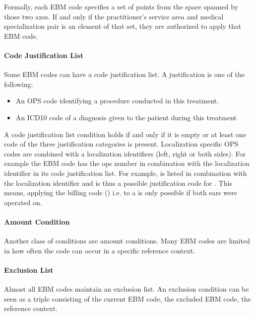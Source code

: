 Formally, each EBM code specifies a set of points from the space spanned by those two axes.
If and only if the practitioner's service area and medical specialization pair is an element of that set, they are authorized to apply that EBM code.


\paragraph{Code Justification List}
Some EBM codes can have a code justification list.
A justification is one of the following:
\begin{itemize}
    \item An OPS code identifying a procedure conducted in this treatment.
    \item An ICD10 code of a diagnosis given to the patient during this treatment
\end{itemize}
A code justification list condition holds if and only if it is empty or at least one code of the three justification categories is present.
Localization specific OPS codes are combined with a localization identifiers (left, right or both sides).
For example the EBM code  has the ops number  in combination with the  localization identifier in its code justification list.
For example,  is listed in combination with the  localization identifier and is thus a possible justification code for .
This means, applying the billing code  () i.e.  to a  is only possible if both ears were operated on.

\paragraph{Amount Condition}\label{par:amount-condition}
Another class of conditions are amount conditions.
Many EBM codes are limited in how often the code can occur in a specific reference context.

\paragraph{Exclusion List}\label{par:exclusion-list}
Almost all EBM codes maintain an exclusion list.
An exclusion condition can be seen as a triple consisting of the current EBM code, the excluded EBM code, the reference context.

